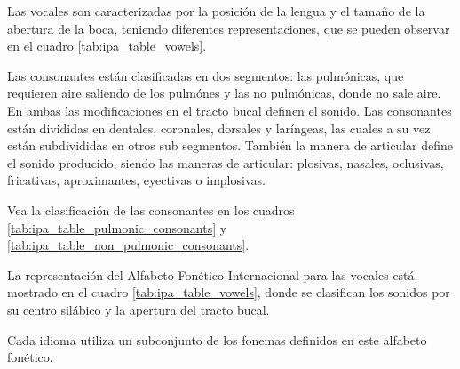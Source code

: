 Las vocales son caracterizadas por la posición de la lengua y el tamaño de la abertura de la boca, teniendo diferentes representaciones, que se pueden observar en el cuadro \ref{tab:ipa_table_vowels}. 

Las consonantes están clasificadas en dos segmentos: las pulmónicas, que requieren aire saliendo de los pulmónes y las no pulmónicas, donde no sale aire. En ambas las modificaciones en el tracto bucal definen el sonido. Las consonantes están divididas en dentales, coronales, dorsales y laríngeas, las cuales a su vez están subdivididas en otros sub segmentos. También la manera de articular define el sonido producido, siendo las maneras de articular: plosivas, nasales, oclusivas, fricativas, aproximantes, eyectivas o implosivas.

Vea la clasificación de las consonantes en los cuadros \ref{tab:ipa_table_pulmonic_consonants} y \ref{tab:ipa_table_non_pulmonic_consonants}.

La representación del Alfabeto Fonético Internacional para las vocales está mostrado en el cuadro \ref{tab:ipa_table_vowels}, donde se clasifican los sonidos por su centro silábico y la apertura del tracto bucal.






Cada idioma utiliza un subconjunto de los fonemas definidos en este alfabeto fonético.

